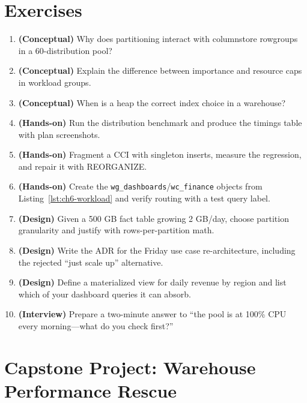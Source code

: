 \section{Exercises}
\begin{enumerate}
    \item \textbf{(Conceptual)} Why does partitioning interact with columnstore rowgroups in a 60-distribution pool?
    \item \textbf{(Conceptual)} Explain the difference between importance and resource caps in workload groups.
    \item \textbf{(Conceptual)} When is a heap the correct index choice in a warehouse?
    \item \textbf{(Hands-on)} Run the distribution benchmark and produce the timings table with plan screenshots.
    \item \textbf{(Hands-on)} Fragment a CCI with singleton inserts, measure the regression, and repair it with REORGANIZE.
    \item \textbf{(Hands-on)} Create the \texttt{wg\_dashboards}/\texttt{wc\_finance} objects from Listing~\ref{lst:ch6-workload} and verify routing with a test query label.
    \item \textbf{(Design)} Given a 500 GB fact table growing 2 GB/day, choose partition granularity and justify with rows-per-partition math.
    \item \textbf{(Design)} Write the ADR for the Friday use case re-architecture, including the rejected ``just scale up'' alternative.
    \item \textbf{(Design)} Define a materialized view for daily revenue by region and list which of your dashboard queries it can absorb.
    \item \textbf{(Interview)} Prepare a two-minute answer to ``the pool is at 100\% CPU every morning---what do you check first?''
\end{enumerate}

\section{Capstone Project: Warehouse Performance Rescue}\label{sec:ch6-capstone}


